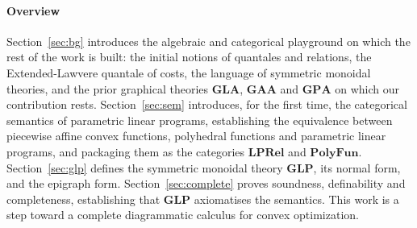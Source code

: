 \paragraph{Overview}
Section~\ref{sec:bg} introduces the algebraic and categorical playground on which the
rest of the work is built: the initial notions of quantales and relations, the Extended-Lawvere
quantale of costs, the language of symmetric monoidal theories, and the prior graphical theories
$\mathbf{GLA}$, $\mathbf{GAA}$ and $\mathbf{GPA}$ on which our contribution rests.
Section~\ref{sec:sem} introduces, for the first time, the categorical semantics of parametric linear
programs, establishing the equivalence between piecewise affine convex functions, polyhedral
functions and parametric linear programs, and packaging them as the categories $\mathbf{LPRel}$ and
$\mathbf{PolyFun}$. Section~\ref{sec:glp} defines the symmetric monoidal theory $\mathbf{GLP}$,
its normal form, and the epigraph form. Section~\ref{sec:complete} proves soundness, definability
and completeness, establishing that $\mathbf{GLP}$ axiomatises the semantics.
This work is a step toward a complete diagrammatic calculus for convex optimization.

